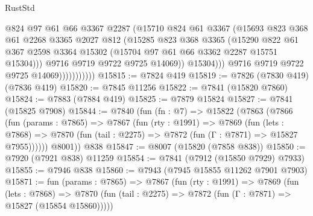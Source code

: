 \begin{lexlean}{RustStd}
\begin{coremodule}
{\begin{coremodule}
{{{{{{{{{{{{{{{{{{{{{{{{{{{{{{{{{{{{{{{{{{{{{{{{{{{{{{                                @824
                                @97
                                @61
                                @66
                                @3367
                                @2287
                                (@15710
                                  @824
                                  @61
                                  @3367
                                  (@15693
                                    @823
                                    @368
                                    @61
                                    @2268
                                    @3365
                                    @2027
                                    @812
                                    (@15285
                                      @823
                                      @368
                                      @3365
                                      (@15290
                                        @822
                                        @61
                                        @367
                                        @2598
                                        @3364
                                        @15302
                                        (@15704 @97 @61 @66 @3362 @2287 @15751 @15304)))
                                    @9716
                                    @9719
                                    @9722
                                    @9725
                                    @14069))
                                @15304)))
                          @9716
                          @9719
                          @9722
                          @9725
                          @14069)))))))))))
@15815 := @7824 @419
@15819 := @7826 (@7830 @419) (@7836 @419)
@15820 := @7845 @11256
@15822 := @7841 (@15820 @7860)
@15824 := @7883 (@7884 @419)
@15825 := @7879 @15824
@15827 := @7841 (@15825 @7908)
@15844 := @7840
    (fun (fn : @7) =>
    @15822
      (@7863
        (@7866
          (fun (params : @7865) =>
          @7867
            (fun (rty : @1991) =>
            @7869
              (fun (lets : @7868) =>
              @7870 (fun (tail : @2275) => @7872 (fun (Γ : @7871) => @15827 @7955))))))
        @8001))
    @838
@15847 := @8007 (@15820 (@7858 @838))
@15850 := @7920 (@7921 @838) @11259
@15854 := @7841 (@7912 (@15850 @7929) @7933)
@15855 := @7946 @838
@15860 := @7943 (@7945 @15855 @11262 @7901 @7903)
@15871 := fun (params : @7865) =>
  @7867
    (fun (rty : @1991) =>
    @7869
      (fun (lets : @7868) =>
      @7870 (fun (tail : @2275) => @7872 (fun (Γ : @7871) => @15827 (@15854 @15860)))))
}}}}}}}}}}}}}}}}}}}}}}}}}}}}}}}}}}}}}}}}}}}}}}}}}}}}}}
\end{coremodule}}
\end{coremodule}
\end{lexlean}
